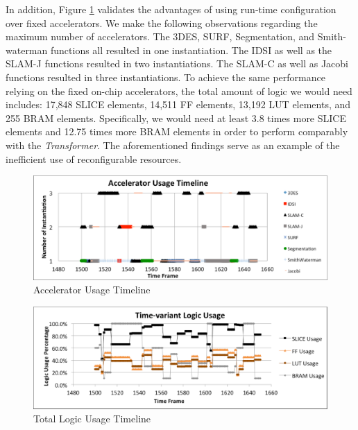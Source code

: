 In addition, Figure \ref{fig_acc_timeline} validates the advantages of using run-time
configuration over fixed accelerators. We make the following observations regarding the maximum number of accelerators. 
The 3DES, SURF, Segmentation, and Smith-waterman functions all resulted in one
instantiation. The IDSI as well as the SLAM-J functions resulted in two instantiations. The SLAM-C as well as Jacobi functions resulted in 
three instantiations. To achieve the same performance relying on the fixed on-chip accelerators, 
the total amount of logic we would need includes: 17,848 SLICE elements, 14,511 FF elements, 13,192 LUT elements, and 255 BRAM elements. 
Specifically, we would need at least 3.8 times
more SLICE elements and 12.75 times more BRAM elements in order to perform comparably with the {\em Transformer}. 
The aforementioned findings serve as an example of the inefficient use of reconfigurable resources.


\begin{figure}[ht]
    \centering
    \includegraphics[width=6.0in]{Acc_timeline}
    \caption{Accelerator Usage Timeline}
    \label{fig_acc_timeline}
\end{figure}

\begin{figure}[ht]
    \centering
    \includegraphics[width=6.0in]{Logic-Usage-Timeline}
    \caption{Total Logic Usage Timeline}
    \label{fig_logic_timeline}
\end{figure}
